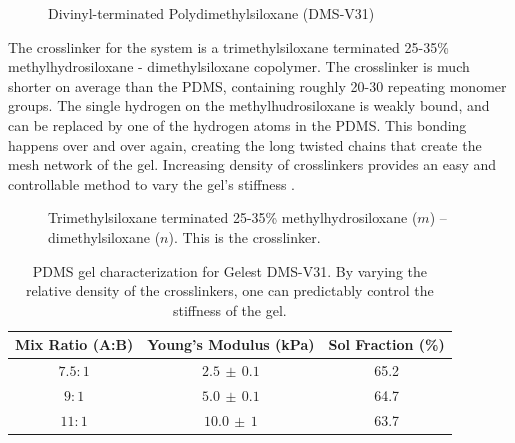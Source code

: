 \begin{figure}[h!]
	\centering
	\label{fig:DMS-V31}
	\caption[DMS-V31]{Divinyl-terminated Polydimethylsiloxane (DMS-V31)}
\end{figure}
\noindent The crosslinker for the system is a trimethylsiloxane terminated 25-35\% methylhydrosiloxane - dimethylsiloxane copolymer. The crosslinker is much shorter on average than the PDMS, containing roughly 20-30 repeating monomer groups. The single hydrogen on the methylhudrosiloxane is weakly bound, and can be replaced by one of the hydrogen atoms in the PDMS. This bonding happens over and over again, creating the long twisted chains that create the mesh network of the gel. Increasing density of crosslinkers provides an easy and controllable method to vary the gel's stiffness \cite{Andreotti2020}. 

\begin{figure}
	\centering
	\label{fig:HMS-301}
	\caption[HMS-301]{Trimethylsiloxane terminated 25-35\% methylhydrosiloxane ($m$) -- dimethylsiloxane ($n$). This is the crosslinker.}
\end{figure}

\begin{table}[h!]
	\begin{center}
		\begin{tabular}{|c||c||c|}
			\hline
			Mix Ratio (A:B) & Young's Modulus (kPa) & Sol Fraction (\%)\\
			\hline
			$7.5:1$ & $2.5 \,\pm\, 0.1$ & 65.2\\
			\hline
			$9:1$ & $5.0 \, \pm\, 0.1$  & 64.7\\
			\hline
			$11:1$ & $10.0 \,\pm\, 1$  & 63.7\\
			\hline
		\end{tabular}
	\end{center}
	\label{tab:recipes}
	\caption[PDMS ratios Characterization]{PDMS gel characterization for Gelest DMS-V31. By varying the relative density of the crosslinkers, one can predictably control the stiffness of the gel.}
\end{table}




